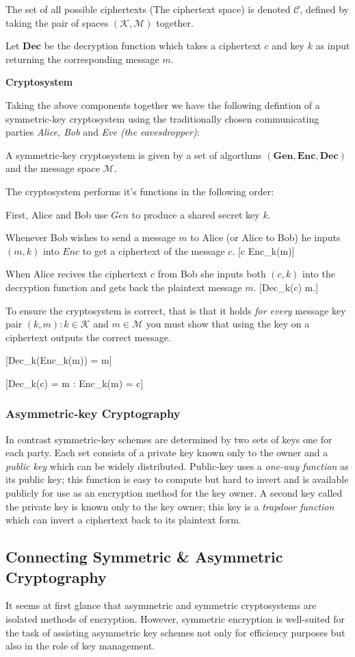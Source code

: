 The set of all possible ciphertexts (The ciphertext space) is denoted $\mathbf{\mathcal{C}}$, defined by taking the pair of spaces $\mathbf{(\mathcal{K}, \mathcal{M})}$ together. 


Let $\mathbf{Dec}$ be the decryption function which takes a ciphertext $c$ and key $k$ as input returning the corresponding message $m$.


\textbf{Cryptosystem}


Taking the above components together we have the following defintion of a symmetric-key cryptosystem using the traditionally chosen communicating parties \emph{Alice, Bob} and \emph{Eve (the eavesdropper)}:


A symmetric-key cryptosystem is given by a set of algorthms $\mathbf{(Gen, Enc, Dec)}$ and the message space $\mathcal{M}$.

The cryptosystem performs it's functions in the following order:

First, Alice and Bob use $Gen$ to produce a shared secret key $k$.

Whenever Bob wishes to send a message $m$ to Alice (or Alice to Bob) he inputs $(m,k)$ into $Enc$ to get a ciphertext of the message $c$.
[c \coloneqq Enc_{k}(m)]

When Alice recives the ciphertext $c$ from Bob she inputs both $(c,k)$ into the decryption function and gets back the plaintext message $m$.
[Dec_{k}(c) \coloneqq m.]
\medskip

To ensure the cryptosystem is correct, that is that it holds \textit{for every} message key pair $(k,m) : k \in \mathcal{K}$ and $m \in \mathcal{M}$ you must show that using the key on a ciphertext outputs the correct message. 

[Dec_{k}(Enc_{k}(m)) = m]

[Dec_{k}(c) = m : Enc_{k}(m) = c]



\subsubsection*{Asymmetric-key Cryptography}
In contrast symmetric-key schemes are determined by two sets of keys one for each party. Each set consists of a private key known only to the owner and a \emph{public key} which can be widely distributed.
Public-key uses a \emph{one-way function} as its public key; this function is easy to compute but hard to invert and is available publicly for use as an encryption method for the key owner. A second key called the private key is known only to the key owner; this key is a \emph{trapdoor function} which can invert a ciphertext back to its plaintext form.

 
\subsection{Connecting Symmetric \& Asymmetric Cryptography}
It seems at first glance that asymmetric and symmetric cryptosystems are isolated methods of encryption. However, symmetric encryption is well-suited for the task of assisting asymmetric key schemes not only for efficiency purposes but also in the role of key management. 
